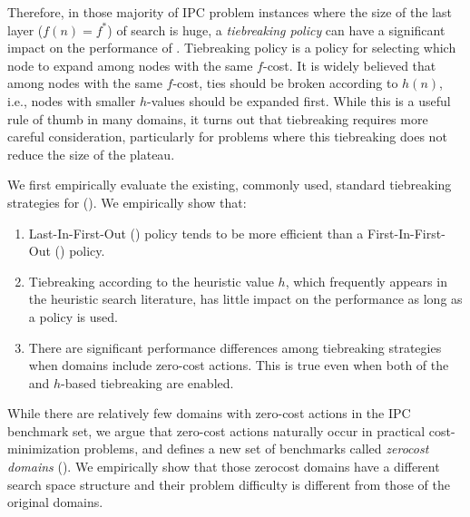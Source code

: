 Therefore, in those majority of IPC problem instances where the size of
the last layer ($f(n)=f^*$) of search is huge, a
\emph{tiebreaking policy} can have a significant impact on the
performance of \astar. Tiebreaking policy is a policy 
for selecting which node to expand among nodes with the same $f$-cost.
It is widely believed that among nodes with the same $f$-cost,
ties should be broken according to $h(n)$, i.e.,
nodes with smaller $h$-values should be expanded first.  While this is a
useful rule of thumb in many domains, it turns out that tiebreaking
requires more careful consideration, particularly for problems where
this tiebreaking does not reduce the size of the plateau.

We first empirically evaluate the existing, commonly used, standard
tiebreaking strategies for \astar ().
We empirically show that:

\begin{enumerate}
 \item Last-In-First-Out (\lifo) policy tends to be more efficient
       than a First-In-First-Out (\fifo) policy.
 \item Tiebreaking according to the heuristic value $h$, which
       frequently appears in the heuristic search literature, has little
       impact on the performance as long as a \lifo policy is used.
 \item There are significant performance differences among tiebreaking strategies
       when domains include zero-cost actions. This is true even when
       both of the \lifo and $h$-based tiebreaking are enabled.
\end{enumerate}

While there are relatively few domains with zero-cost actions in the IPC
benchmark set, we argue that zero-cost actions naturally occur in
practical cost-minimization problems, and defines a new set of
benchmarks called \emph{zerocost domains}
().  We empirically show that those
zerocost domains have a different search space structure and their
problem difficulty is different from those of the original domains.

